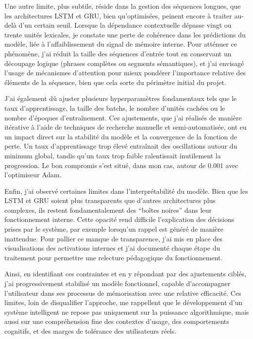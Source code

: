 \documentclass[11pt,a4paper]{report}
\begin{document}
Une autre limite, plus subtile, réside dans la gestion des séquences longues, que les architectures LSTM et GRU, bien qu’optimisées, peinent encore à traiter au-delà d’un certain seuil. Lorsque la dépendance contextuelle dépasse vingt ou trente unités lexicales, je constate une perte de cohérence dans les prédictions du modèle, liée à l’affaiblissement du signal de mémoire interne. Pour atténuer ce phénomène, j’ai réduit la taille des séquences d’entrée tout en conservant un découpage logique (phrases complètes ou segments sémantiques), et j’ai envisagé l’usage de mécanismes d’attention pour mieux pondérer l’importance relative des éléments de la séquence, bien que cela sorte du périmètre initial du projet.

J’ai également dû ajuster plusieurs hyperparamètres fondamentaux tels que le taux d’apprentissage, la taille des batchs, le nombre d’unités cachées ou le nombre d’époques d’entraînement. Ces ajustements, que j’ai réalisés de manière itérative à l’aide de techniques de recherche manuelle et semi-automatisée, ont eu un impact direct sur la stabilité du modèle et la convergence de la fonction de perte. Un taux d’apprentissage trop élevé entraînait des oscillations autour du minimum global, tandis qu’un taux trop faible ralentissait inutilement la progression. Le bon compromis s’est situé, dans mon cas, autour de 0.001 avec l’optimiseur Adam.

Enfin, j’ai observé certaines limites dans l’interprétabilité du modèle. Bien que les LSTM et GRU soient plus transparents que d’autres architectures plus complexes, ils restent fondamentalement des “boîtes noires” dans leur fonctionnement interne. Cette opacité rend difficile l’explication des décisions prises par le système, par exemple lorsqu’un rappel est généré de manière inattendue. Pour pallier ce manque de transparence, j’ai mis en place des visualisations des activations internes et j’ai documenté chaque étape du traitement pour permettre une relecture pédagogique du fonctionnement.

Ainsi, en identifiant ces contraintes et en y répondant par des ajustements ciblés, j’ai progressivement stabilisé un modèle fonctionnel, capable d’accompagner l’utilisateur dans ses processus de mémorisation avec une relative efficacité. Ces limites, loin de disqualifier l’approche, me rappellent que le développement d’un système intelligent ne repose pas uniquement sur la puissance algorithmique, mais aussi sur une compréhension fine des contextes d’usage, des comportements cognitifs, et des marges de tolérance des utilisateurs réels.
\end{document}
